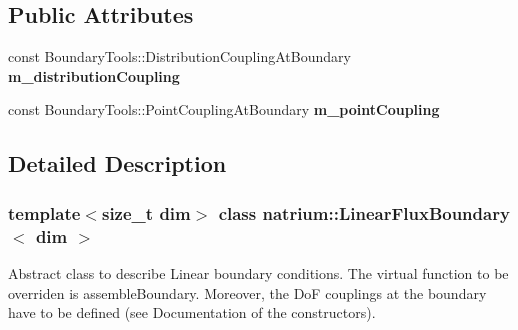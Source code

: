 \subsection*{Public Attributes}
\begin{DoxyCompactItemize}
\item 
\hypertarget{classnatrium_1_1LinearFluxBoundary_a43cb1a741dedeef2b4bb190b01276806}{
const BoundaryTools::DistributionCouplingAtBoundary {\bfseries m\_\-distributionCoupling}}
\label{classnatrium_1_1LinearFluxBoundary_a43cb1a741dedeef2b4bb190b01276806}

\item 
\hypertarget{classnatrium_1_1LinearFluxBoundary_ab94f9bae96855ffc67e7b8f1745fecd4}{
const BoundaryTools::PointCouplingAtBoundary {\bfseries m\_\-pointCoupling}}
\label{classnatrium_1_1LinearFluxBoundary_ab94f9bae96855ffc67e7b8f1745fecd4}

\end{DoxyCompactItemize}


\subsection{Detailed Description}
\subsubsection*{template$<$size\_\-t dim$>$ class natrium::LinearFluxBoundary$<$ dim $>$}

Abstract class to describe Linear boundary conditions. The virtual function to be overriden is assembleBoundary. Moreover, the DoF couplings at the boundary have to be defined (see Documentation of the constructors). 

